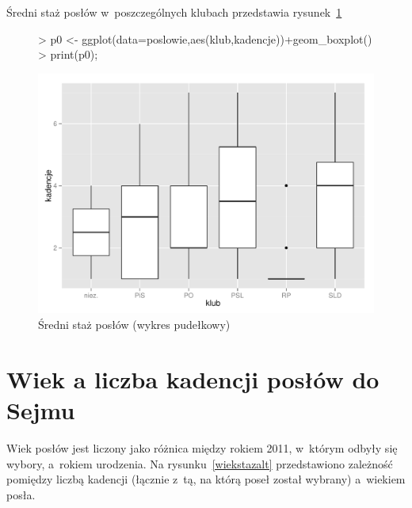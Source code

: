 \documentclass[a4paper]{article}
\begin{document}
Średni staż posłów w~poszczególnych klubach przedstawia rysunek~\ref{srstaz}

\begin{figure}[!tbh]
\begin{Schunk}
\begin{Sinput}
> p0 <- ggplot(data=poslowie,aes(klub,kadencje))+geom_boxplot()
> print(p0);
\end{Sinput}
\end{Schunk}
\includegraphics{sejm7_wg_stazu_wieku-srstaz}
\caption{Średni staż posłów (wykres pudełkowy) \label{srstaz}}
\end{figure}


\section{Wiek a liczba kadencji posłów do Sejmu}

Wiek posłów jest liczony jako różnica między rokiem 2011, w~którym odbyły się wybory, a~rokiem urodzenia.
Na rysunku~\ref{wiekstazalt} przedstawiono zależność pomiędzy liczbą kadencji (łącznie z~tą, na którą poseł
został wybrany) a~wiekiem posła.
\end{document}
